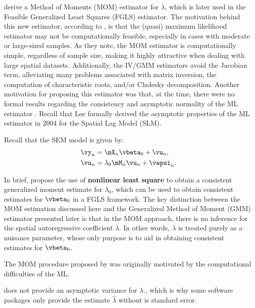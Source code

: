 \cite{kelejian1999generalized} derive a Method of Moments (MOM) estimator for $\lambda$, which is later used in the Feasible Generalized Least Squares (FGLS) estimator. The motivation behind this new estimator, according to \cite{kelejian1999generalized}, is that the (quasi) maximum likelihood estimator may not be computationally feasible, especially in cases with moderate or large-sized samples. As they note, the MOM estimator is computationally simple, regardless of sample size, making it highly attractive when dealing with large spatial datasets. Additionally, the IV/GMM estimators avoid the Jacobian term, alleviating many problems associated with matrix inversion, the computation of characteristic roots, and/or Cholesky decomposition. Another motivation for proposing this estimator was that, at the time, there were no formal results regarding the consistency and asymptotic normality of the ML estimator  \citep[pag. 1608]{pruchaHB}. Recall that Lee formally derived the asymptotic properties of the ML estimator in 2004 for the Spatial Lag Model (SLM).   

Recall that the SEM model is given by: 
\begin{equation}\label{eq:sem_gmm}
	\begin{aligned}
	\vy_n  & = \mX_n\vbeta_0 + \vu_n, \\ 
	\vu_n  & = \lambda_0\mM_n \vu_n + \vepsi_n.
	\end{aligned}
\end{equation}

In brief, \cite{kelejian1999generalized} propose the use of \textbf{nonlinear least square} to obtain a consistent generalized moment estimate for $\lambda_0$, which can be used to obtain consistent estimates for $\vbeta_0$ in a FGLS framework. The key distinction between the MOM estimation discussed here and the Generalized Method of Moment (GMM) estimator presented later is that in the MOM approach, there is no inference for the spatial autoregressive coefficient $\lambda$. In other words, $\lambda$ is treated purely as a nuisance parameter, whose only purpose is to aid in obtaining consistent estimates for $\vbeta_0$.

\begin{remark}
The MOM procedure proposed by \cite{kelejian1999generalized} was originally motivated by the computational difficulties of the ML.
\end{remark}

\begin{remark}
\cite{kelejian1999generalized} does not provide an asymptotic variance for $\lambda$., which is why some software packages only provide the estimate $\widehat{\lambda}$ without is standard error. 
\end{remark}


